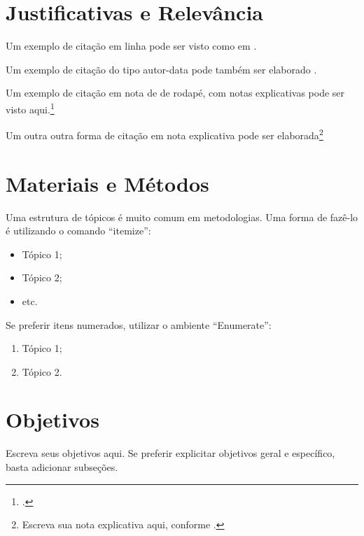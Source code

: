 \documentclass[
	12pt,				%
	openright,			%
	oneside,			%
	a4paper,			%
	english,			%
	brazil				%
	]{abntex2}
\begin{document}
\section{Justificativas e Relevância}

Um exemplo de citação em linha pode ser visto como em \textcite{Einstein1920}.

Um exemplo de citação do tipo autor-data pode também ser elaborado \cite{Einstein1920}.

Um exemplo de citação em nota de de rodapé, com notas explicativas pode ser visto aqui.\footcite[Esta nota vem antes.][p.~22]{descartes-carta-mersene}

Um outra outra forma de citação em nota explicativa pode ser elaborada\footnote{Escreva sua nota explicativa aqui, conforme \textcite{boyle1772}.}

\section{Materiais e Métodos}
Uma estrutura de tópicos é muito comum em metodologias. Uma forma de fazê-lo é utilizando o comando ``itemize'':

\begin{itemize}
	\item Tópico 1;
	\item Tópico 2;
	\item etc.
\end{itemize}

Se preferir itens numerados, utilizar o ambiente ``Enumerate'':
	\begin{enumerate}
	\item Tópico 1;
	\item Tópico 2.
\end{enumerate}

\section{Objetivos}
Escreva seus objetivos aqui. Se preferir explicitar objetivos geral e específico, basta adicionar subseções.
%
%
\end{document}
